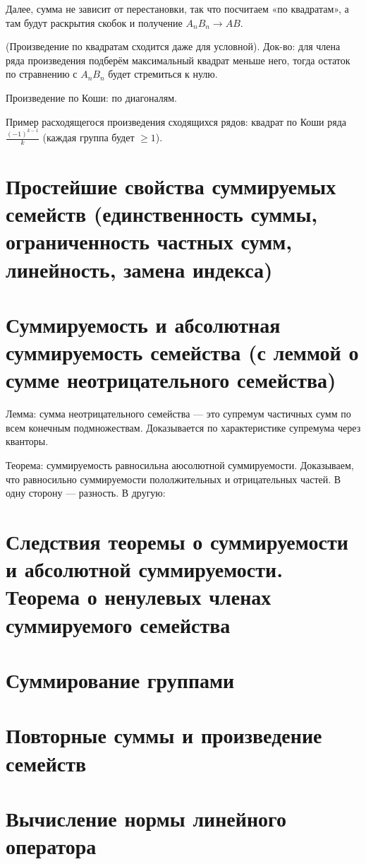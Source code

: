 \documentclass[12pt, a4paper]{article}
\begin{document}
    Далее, сумма не зависит от перестановки, так что посчитаем «по квадратам», а там будут раскрытия скобок и получение $A_n B_n → AB$.

    \splitdoc
    (Произведение по квадратам сходится даже для условной). Док-во: для члена ряда произведения подберём максимальный квадрат меньше него,
    тогда остаток по стравнению с $A_n B_n$ будет стремиться к нулю.

    Произведение по Коши: по диагоналям.

    Пример расходящегося произведения сходящихся рядов: квадрат по Коши ряда $\frac{(-1)^{k - 1}}{k}$ (каждая группа будет $\geqslant 1$).



\section{Простейшие свойства суммируемых семейств (единственность суммы, ограниченность частных сумм, линейность, замена индекса)}

    

\section{Суммируемость и абсолютная суммируемость семейства (с леммой о сумме неотрицательного семейства)}

    Лемма: сумма неотрицательного семейства — это супремум частичных сумм по всем конечным подмножествам. 
    Доказывается по характеристике супремума через кванторы.

    Теорема: суммируемость равносильна аюсолютной суммируемости. 
    Доказываем, что равносильно суммируемости пололжительных и отрицательных частей. В одну сторону — разность. В другую: 


\section{Следствия теоремы о суммируемости и абсолютной суммируемости. Теорема о ненулевых членах суммируемого семейства}
\section{Суммирование группами}
\section{Повторные суммы и произведение семейств}

\section{Вычисление нормы линейного оператора}
\end{document}
